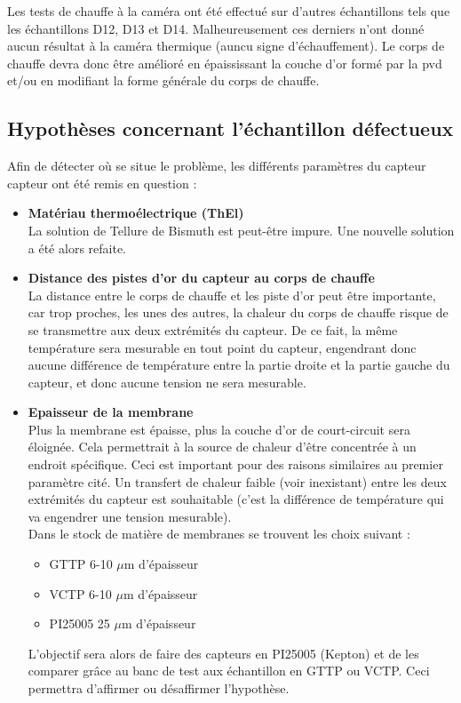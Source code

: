 Les tests de chauffe à la caméra ont été effectué sur d'autres échantillons tels que les échantillons D12, D13 et D14. Malheureusement ces derniers 
n'ont donné aucun résultat à la caméra thermique (auncu signe d'échauffement). Le corps de chauffe devra donc être amélioré en épaississant la 
couche d'or formé par la \gls{pvd} et/ou en modifiant la forme générale du corps de chauffe. 

\subsection{Hypothèses concernant l'échantillon défectueux}
Afin de détecter où se situe le problème, les différents paramètres du capteur \gls{capteur} ont été remis en question :
\begin{itemize}
    \item \textbf{Matériau thermoélectrique (ThEl)}\\
          La solution de Tellure de Bismuth est peut-être impure. Une nouvelle solution a été alors refaite.
          
    \item \textbf{Distance des pistes d'or du capteur au corps de chauffe}\\
          La distance entre le corps de chauffe et les piste d'or peut être importante, car trop proches, les unes des autres, la chaleur du corps
          de chauffe risque de se transmettre aux deux extrémités du capteur. De ce fait, la même température sera mesurable en tout point du
          capteur, engendrant donc aucune différence de température entre la partie droite et la partie gauche du \gls{capteur}, et donc aucune
          tension ne sera mesurable.\\
          
    \item \textbf{Epaisseur de la membrane} \\
          Plus la membrane est épaisse, plus la couche d'or de court-circuit sera éloignée. Cela permettrait à la source de chaleur d'être concentrée
          à un endroit spécifique. Ceci est important pour des raisons similaires au premier paramètre cité. Un transfert de chaleur faible (voir
          inexistant) entre les deux extrémités du \gls{capteur} est souhaitable (c'est la différence de température qui va engendrer une tension
          mesurable). \\
          
          Dans le stock de matière de membranes se trouvent les choix suivant :
          \begin{itemize}
              \item GTTP 6-10 $\mu$m d'épaisseur
              \item VCTP 6-10 $\mu$m d'épaisseur
              \item PI25005 25 $\mu$m d'épaisseur
          \end{itemize}
          L'objectif sera alors de faire des capteurs en PI25005 (Kepton) et de les comparer grâce au banc de test aux échantillon en GTTP ou VCTP.
          Ceci permettra d'affirmer ou désaffirmer l'hypothèse.\\
          

\end{itemize}
